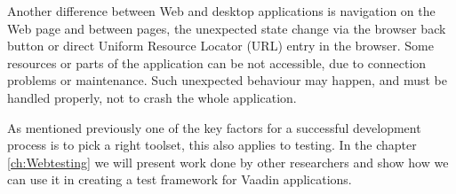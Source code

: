 		Another difference between Web and desktop applications is
		navigation on the Web page and between pages, the unexpected state change via
		the browser back button or direct Uniform Resource Locator (URL) entry in the
		browser. Some resources or parts of the application can be not
		accessible, due to connection problems or maintenance. Such unexpected
		behaviour may happen, and must be handled properly, not to crash the whole application.

    As mentioned previously one of the key factors for a successful
    development process is to pick a right toolset, this also applies to
    testing. In the chapter \ref{ch:Webtesting} we will present work done by
    other researchers and show how we can use it in creating a test framework
    for Vaadin applications.
      			
